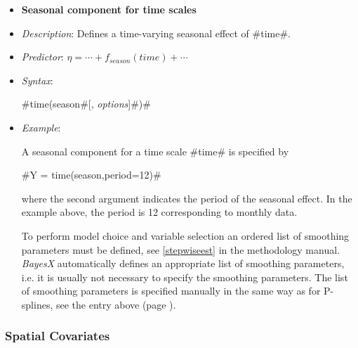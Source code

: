 \begin{itemize}
%
%
%
%
%
%


\item[]{\bf\sffamily Seasonal component for time scales}

\item[] {\em Description}: Defines a time-varying seasonal effect
of #time#. \item[] {\em Predictor}: $\eta =  \cdots +
f_{season}(time) + \cdots $ \item[] {\em Syntax}:

#time(season#[, {\em options}]#)#
\item[] {\em Example}:

A seasonal component for a time scale #time# is specified by

#Y = time(season,period=12)#

where the second argument indicates the period of the seasonal
effect. In the example above, the period is 12 corresponding to
monthly data.

To perform model choice and variable selection an ordered list of smoothing parameters must be defined, see
\autoref{stepwiseest} in the methodology manual. {\em BayesX} automatically defines an appropriate list of smoothing
parameters, i.e. it is usually not necessary to  specify the smoothing parameters. The list of smoothing parameters is
specified manually in the same way as for P-splines, see the entry above (page \pageref{psplines_stepwise}).
\end{itemize}

\subsubsection*{Spatial Covariates}

